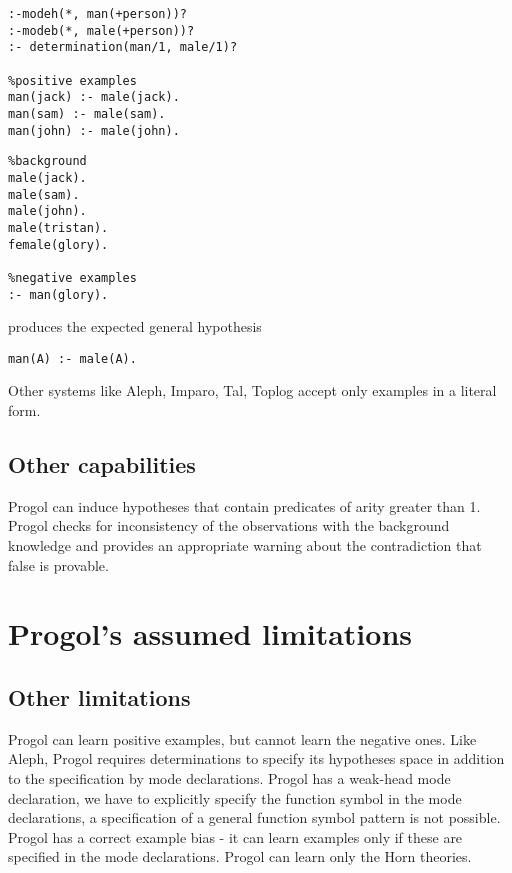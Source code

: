 \begin{minipage}[t]{.60\textwidth}
\begin{lstlisting}
:-modeh(*, man(+person))?
:-modeb(*, male(+person))?
:- determination(man/1, male/1)?

%positive examples
man(jack) :- male(jack).
man(sam) :- male(sam).
man(john) :- male(john).
\end{lstlisting}
\end{minipage}
\begin{minipage}[t]{.20\textwidth}
\begin{lstlisting}
%background
male(jack).
male(sam).
male(john).
male(tristan).
female(glory).

%negative examples
:- man(glory).
\end{lstlisting}
\end{minipage}

produces the expected general hypothesis
\begin{lstlisting}
man(A) :- male(A).
\end{lstlisting}

Other systems like Aleph, Imparo, Tal, Toplog accept only examples in a literal form.

\subsection{Other capabilities}
Progol can induce hypotheses that contain predicates of arity greater than 1. Progol checks for inconsistency of the observations with the background knowledge and provides an appropriate warning about the contradiction that false is provable.

\section{Progol's assumed limitations}

\subsection{Other limitations}
Progol can learn positive examples, but cannot learn the negative ones. Like Aleph, Progol requires determinations to specify its hypotheses space in addition to the specification by mode declarations. Progol has a weak-head mode declaration, we have to explicitly specify the function symbol in the mode declarations, a specification of a general function symbol pattern is not possible. Progol has a correct example bias - it can learn examples only if these are specified in the mode declarations. Progol can learn only the Horn theories.

